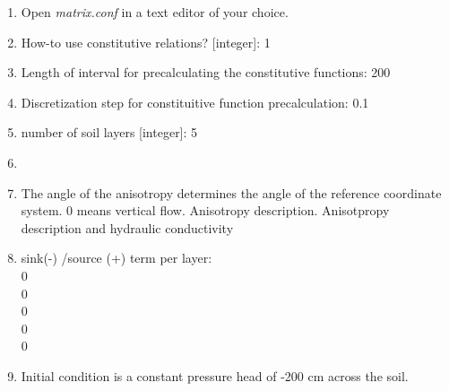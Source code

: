 \documentclass[
10pt, %
a4paper, %
oneside, %
headinclude,footinclude, %
BCOR5mm, %
]{scrartcl}
\begin{document}
\begin{enumerate}
\item Open \emph{matrix.conf} in a text editor of your choice. 
\item How-to use constitutive relations? [integer]: 1
\item Length of interval for precalculating the constitutive functions: 200
\item Discretization step for constituitive function precalculation: 0.1
\item number of soil layers [integer]: 5
\item {}
\item The angle of the anisotropy determines the angle of the reference coordinate system. 0 means vertical flow. Anisotropy description. Anisotpropy description and hydraulic conductivity\\ 
\item sink(-) /source (+) term per layer: \\ 0 \\ 0 \\0 \\0 \\ 0
\item Initial condition is a constant pressure head of -200 cm across the soil. 
\end{enumerate}
\end{document}

